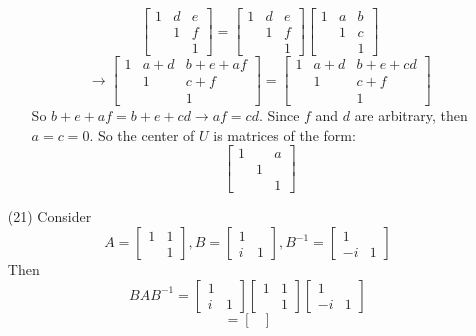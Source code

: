 \begin{itemize}
\begin{itemize}
$$\begin{bmatrix}
1 & d & e \\
& 1 & f \\
& & 1
\end{bmatrix} = \begin{bmatrix}
1 & d & e \\
& 1 & f \\
& & 1
\end{bmatrix}\begin{bmatrix}
1 & a & b \\
& 1 & c \\
& & 1
\end{bmatrix}$$
$$\rightarrow \begin{bmatrix}
1 & a + d & b + e + af \\
& 1 & c + f \\
& & 1
\end{bmatrix} = \begin{bmatrix}
1 & a + d & b + e + cd \\
& 1 & c + f \\
& & 1
\end{bmatrix}$$
So $b + e + af = b + e + cd \rightarrow af = cd$. Since $f$ and $d$ are arbitrary, then $a = c = 0$. So the center of $U$ is matrices of the form:
$$\begin{bmatrix}
1 & & a \\
& 1 \\
& & 1
\end{bmatrix}$$
\end{itemize}
\item[(21)]
Consider 
$$A = \begin{bmatrix}
1 & 1 \\
& 1
\end{bmatrix}, B = \begin{bmatrix}
1 \\
i & 1
\end{bmatrix}, B^{-1} = \begin{bmatrix}
1 \\
-i & 1
\end{bmatrix}$$
Then
$$BAB^{-1} = \begin{bmatrix}
1 \\
i & 1
\end{bmatrix}\begin{bmatrix}
1 & 1 \\
& 1
\end{bmatrix}\begin{bmatrix}
1 & \\
-i & 1
\end{bmatrix}$$
$$= \begin{bmatrix}

\end{bmatrix}$$
\end{itemize}
